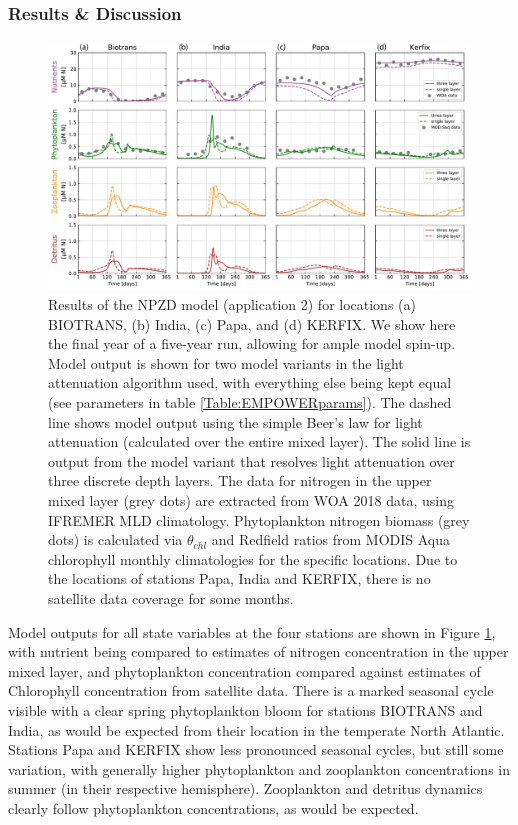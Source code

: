 \documentclass[journal abbreviation, manuscript]{copernicus}
\begin{document}
\subsubsection{Results \& Discussion}
\begin{figure}[t]
\includegraphics[width=15cm]{Figures/firstdraft_plots/02_EMPOWER_lightcomp.pdf}
\caption{Results of the NPZD model (application 2) for locations (a) BIOTRANS, (b) India, (c) Papa, and (d) KERFIX. We show here the final year of a five-year run, allowing for ample model spin-up. Model output is shown for two model variants in the light attenuation algorithm used, with everything else being kept equal (see parameters in table \ref{Table:EMPOWERparams}). The dashed line shows model output using the simple Beer's law for light attenuation (calculated over the entire mixed layer). The solid line is output from the model variant that resolves light attenuation over three discrete depth layers. The data for nitrogen in the upper mixed layer (grey dots) are extracted from WOA 2018 data, using IFREMER MLD climatology. Phytoplankton nitrogen biomass (grey dots) is calculated via $\theta_{chl}$ and Redfield ratios from MODIS Aqua chlorophyll monthly climatologies for the specific locations. Due to the locations of stations Papa, India and KERFIX, there is no satellite data coverage for some months.}
\label{Figure:ResultsEMPOWER}
\end{figure}


Model outputs for all state variables at the four stations are shown in Figure \ref{Figure:ResultsEMPOWER}, with nutrient being compared to estimates of nitrogen concentration in the upper mixed layer, and phytoplankton concentration compared against estimates of Chlorophyll concentration from satellite data.
There is a marked seasonal cycle visible with a clear spring phytoplankton bloom for stations BIOTRANS and India, as would be expected from their location in the temperate North Atlantic. Stations Papa and KERFIX show less pronounced seasonal cycles, but still some variation, with generally higher phytoplankton and zooplankton concentrations in summer (in their respective hemisphere). Zooplankton and detritus dynamics clearly follow phytoplankton concentrations, as would be expected.
\end{document}
